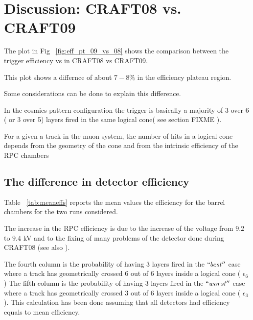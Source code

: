 \section{Discussion: CRAFT08 vs. CRAFT09}


The plot in Fig ~\ref{fig:eff_pt_09_vs_08} shows the comparison between 
the trigger efficiency vs \pt in CRAFT08 vs CRAFT09.



This plot shows a differnce of about $7-8 \% $  in the efficiency plateau region.


Some considerations can be done to explain this difference.

In the cosmics pattern configuration the trigger is basically
a majority of 3 over 6 ( or 3 over 5) layers fired in the
same logical cone( see section FIXME ).

For a given a track in the muon system,
the number of hits in a logical cone
depends from the geometry of the cone and 
from the intrinsic efficiency of the RPC chambers

\subsection{The difference in detector efficiency }

Table ~\ref{tab:meaneffs} reports the mean values the efficiency 
for the barrel chambers for the two runs considered.

The increase in the RPC efficiency is due to the increase of the 
voltage from $9.2$ to $9.4$ kV and to the fixing of many problems 
of the detector done during CRAFT08 (see also \cite{ref:craft08pap} ).

The fourth column is the probability of having 3 layers fired
in the $``best''$ case where a track has 
geometrically crossed 6 out of 6 layers inside a 
logical cone ( $\epsilon_{6}$)
The fifth column is the 
probability of having 3 layers fired
in the  $ ``worst''$ case where
a track has geometrically crossed 3 out of 6 layers inside a 
logical cone ( $\epsilon_{3}$ ).
This calculation has been done
assuming that all detectors had efficiency equals to mean efficiency.


